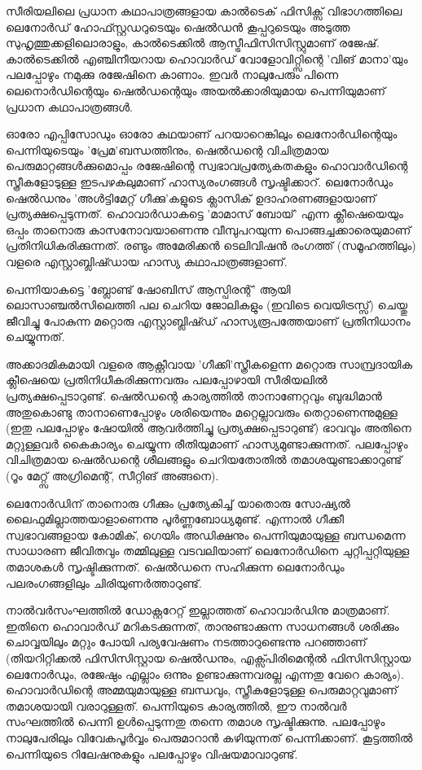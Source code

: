 സീരിയലിലെ പ്രധാന കഥാപാത്രങ്ങളായ കാല്‍ടെക് ഫിസിക്സ് വിഭാഗത്തിലെ ലെനോര്‍ഡ് ഹോഫ്സ്റ്റഡറുടെയും ഷെല്‍ഡന്‍ 
കൂപ്പറുടെയും അടുത്ത സുഹൃത്തുക്കളിലൊരാളും, കാല്‍ടെക്കില്‍ ആസ്ട്രീഫിസിസിസ്റ്റുമാണ് രജേഷ്. കാല്‍ടെക്കില്‍ എഞ്ചിനീയറായ
 ഹൊവാര്‍ഡ് വോളോവിറ്റ്സിന്റെ 'വിങ് മാനാ'യും പലപ്പോഴും നമുക്കു രജേഷിനെ കാണാം. ഇവര്‍ നാലുപേരും പിന്നെ 
 ലെനൊര്‍ഡിന്റെയും ഷെല്‍ഡന്റെയും അയല്‍ക്കാരിയുമായ പെന്നിയുമാണ് പ്രധാന കഥാപാത്രങ്ങള്‍.

ഓരോ എപ്പിസോഡും ഓരോ കഥയാണ് പറയാറെങ്കിലും ലെനോര്‍ഡിന്റെയും പെന്നിയുടെയും 'പ്രേമ'ബന്ധത്തിനും, ഷെല്‍ഡന്റെ 
വിചിത്രമായ പെരുമാറ്റങ്ങള്‍ക്കുമൊപ്പം രജേഷിന്റെ സ്വഭാവപ്രത്യേകതകളും ഹൊവാര്‍ഡിന്റെ സ്ത്രീകളോടുള്ള ഇടപഴകലുമാണ് 
ഹാസ്യരംഗങ്ങള്‍ സൃഷ്ടിക്കാറ്. ലെനോര്‍ഡും ഷെല്‍ഡനും 'അള്‍ട്ടിമേറ്റ് ഗീക്കു'കളുടെ ക്ലാസിക് ഉദാഹരണങ്ങളായാണ് 
പ്രത്യക്ഷപ്പെടുന്നത്. ഹൊവാര്‍ഡാകട്ടെ 'മാമാസ് ബോയ്' എന്ന ക്ലീഷെയെയും ഒപ്പം താനൊരു കാസനോവയാണെന്നു 
വീമ്പുപറയുന്ന പൊങ്ങച്ചക്കാരെയുമാണ് പ്രതിനിധികരിക്കുന്നത്. രണ്ടും അമേരിക്കന്‍ ടെലിവിഷന്‍ രംഗത്ത് (സമൂഹത്തിലും)
 വളരെ എസ്റ്റാബ്ലിഷ്ഡായ ഹാസ്യ കഥാപാത്രങ്ങളാണ്.

പെന്നിയാകട്ടെ 'ബ്ലോണ്ട് ഷോബിസ് ആസ്പിരന്റ്' ആയി ലൊസാഞ്ചല്‍സിലെത്തി പല ചെറിയ ജോലികളും (ഇവിടെ വെയിട്രസ്സ്)
 ചെയ്തു ജീവിച്ചു പോകുന്ന മറ്റൊരു എസ്റ്റാബ്ലിഷ്ഡ് ഹാസ്യരൂപത്തേയാണ് പ്രതിനിധാനം ചെയ്യുന്നത്.

അക്കാദമികമായി വളരെ ആക്റ്റീവായ 'ഗീക്കി'സ്ത്രീകളെന്ന മറ്റൊരു സാമ്പ്രദായിക ക്ലീഷെയെ പ്രതിനിധീകരിക്കുന്നവരും 
പലപ്പോഴായി സീരിയലില്‍ പ്രത്യക്ഷപ്പെടാറുണ്ട്. ഷെല്‍ഡന്റെ കാര്യത്തില്‍ താനാണേറ്റവും ബുദ്ധിമാന്‍ അതുകൊണ്ടു 
താനാണെപ്പോഴും ശരിയെന്നും മറ്റെല്ലാവരും തെറ്റാണെന്നുമുള്ള (ഇതു പലപ്പോഴും ഷോയില്‍ ആവര്‍ത്തിച്ചു പ്രത്യക്ഷപ്പെടാറുണ്ട്) 
ഭാവവും അതിനെ മറ്റുള്ളവര്‍ കൈകാര്യം ചെയ്യുന്ന രീതിയുമാണ് ഹാസ്യമുണ്ടാക്കുന്നത്. പലപ്പോഴും വിചിത്രമായ ഷെല്‍ഡന്റെ 
ശീലങ്ങളും ചെറിയതോതില്‍ തമാശയുണ്ടാക്കാറുണ്ട് (റൂം മേറ്റ്സ് അഗ്രിമെന്റ്, സീറ്റിങ് അങ്ങനെ).

ലെനോര്‍ഡിന് താനൊരു ഗീക്കും പ്രത്യേകിച്ച് യാതൊരു സോഷ്യല്‍ ലൈഫുമില്ലാത്തയാളാണെന്നു പൂര്‍ണ്ണബോധ്യമുണ്ട്. 
എന്നാല്‍ ഗീക്കീ സ്വഭാവങ്ങളായ കോമിക്, ഗെയിം അഡിക്ഷനും പെന്നിയുമായുള്ള ബന്ധമെന്ന സാധാരണ ജീവിതവും തമ്മിലുള്ള
 വടവലിയാണ് ലെനോര്‍ഡിനെ ചുറ്റിപ്പറ്റിയുള്ള തമാശകള്‍ സൃഷ്ടിക്കുന്നത്. ഷെല്‍ഡനെ സഹിക്കുന്ന ലെനോര്‍ഡും പലരംഗങ്ങളിലും
  ചിരിയുണര്‍ത്താറുണ്ട്.



നാല്‍വര്‍സംഘത്തില്‍ ഡോക്റ്ററേറ്റ് ഇല്ലാത്തത് ഹൊവാര്‍ഡിനു മാത്രമാണ്. ഇതിനെ ഹൊവാര്‍ഡ് മറികടക്കുന്നത്, 
താനുണ്ടാക്കുന്ന സാധനങ്ങള്‍ ശരിക്കും ചൊവ്വയിലും മറ്റും പോയി പര്യവേഷണം നടത്താറുണ്ടെന്നു പറഞ്ഞാണ് (തിയറിറ്റിക്കല്‍ 
ഫിസിസിസ്റ്റായ ഷെല്‍ഡനും, എക്സ്പിരിമെന്റല്‍ ഫിസിസിസ്റ്റായ ലെനോര്‍ഡും, രജേഷും എല്ലാം ഒന്നും ഉണ്ടാക്കുന്നവരല്ല എന്നതു
 വേറെ കാര്യം). ഹൊവാര്‍ഡിന്റെ അമ്മയുമായുള്ള ബന്ധവും, സ്ത്രീകളോടുള്ള പെരുമാറ്റവുമാണ് തമാശയായി വരാറുള്ളത്. 
 പെന്നിയുടെ കാര്യത്തില്‍, ഈ നാല്‍വര്‍ സംഘത്തില്‍ പെന്നി ഉള്‍പ്പെടുന്നതു തന്നെ തമാശ സൃഷ്ടിക്കുന്നു. പലപ്പോഴും നാലുപേരിലും
  വിവേകപൂര്‍വ്വം പെരുമാറാന്‍ കഴിയുന്നത് പെന്നിക്കാണ്. കൂട്ടത്തില്‍ പെന്നിയുടെ റിലേഷനുകളും പലപ്പോഴും വിഷയമാവാറുണ്ട്.

